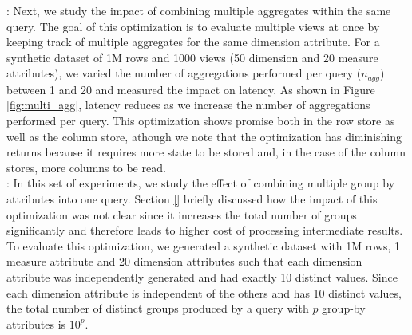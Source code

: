 
: Next, we study the impact of
combining multiple aggregates within the same query.
The goal of this optimization is to evaluate multiple views at once by keeping
track of multiple aggregates for the same dimension attribute.
For a synthetic dataset of 1M rows and 1000 views (50 dimension and 20 measure
attributes), we varied the number of aggregations performed per query
($n_{agg}$) between 1 and 20 and measured the impact on latency.
As shown in Figure \ref{fig:multi_agg}, latency reduces as we increase the
number of aggregations performed per query.
This optimization shows promise both in the row store as well as the column
store, athough we note that the optimization has diminishing returns because it
requires more state to be stored and, in the case of the column stores, more
columns to be read. \\


: In this set of experiments, we
study the effect of combining multiple group by attributes into one query.
Section \ref{} briefly discussed how the impact of this optimization was not
clear since it increases the total number of groups significantly and therefore
leads to higher cost of processing intermediate results.
To evaluate this optimization, we generated a synthetic dataset with 1M rows, 1
measure attribute and 20 dimension attributes such that each dimension attribute
was independently generated and had exactly 10 distinct values.
Since each dimension attribute is independent of the others and has 10 distinct
values, the total number of distinct groups produced by a query
with $p$ group-by attributes is $10^p$.

